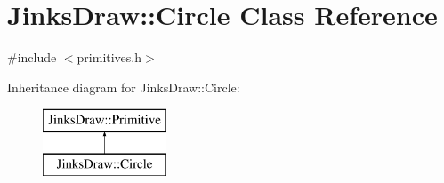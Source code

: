 \hypertarget{class_jinks_draw_1_1_circle}{}\section{Jinks\+Draw\+:\+:Circle Class Reference}
\label{class_jinks_draw_1_1_circle}


{\ttfamily \#include $<$primitives.\+h$>$}

Inheritance diagram for Jinks\+Draw\+:\+:Circle\+:\begin{figure}[H]
\begin{center}
\leavevmode
\includegraphics[height=2.000000cm]{class_jinks_draw_1_1_circle}
\end{center}
\end{figure}
